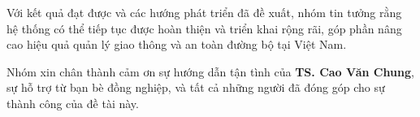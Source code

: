 Với kết quả đạt được và các hướng phát triển đã đề xuất, nhóm tin tưởng rằng hệ thống có thể tiếp tục được hoàn thiện và triển khai rộng rãi, góp phần nâng cao hiệu quả quản lý giao thông và an toàn đường bộ tại Việt Nam.

Nhóm xin chân thành cảm ơn sự hướng dẫn tận tình của \textbf{TS. Cao Văn Chung}, sự hỗ trợ từ bạn bè đồng nghiệp, và tất cả những người đã đóng góp cho sự thành công của đề tài này.
